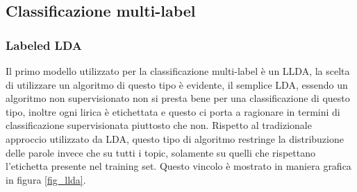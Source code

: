 \documentclass[technote]{IEEEtran}
\begin{document}
\subsection{Classificazione multi-label}
\subsubsection{Labeled LDA}
Il primo modello utilizzato per la classificazione multi-label è un LLDA, la 
scelta di utilizzare un algoritmo di questo tipo è evidente, il semplice LDA, 
essendo un algoritmo non supervisionato non si presta bene per una 
classificazione di questo tipo, inoltre ogni lirica è etichettata e questo ci 
porta a ragionare in termini di classificazione supervisionata piuttosto che 
non. Rispetto al tradizionale approccio utilizzato da LDA, questo tipo di 
algoritmo restringe la distribuzione delle parole invece che su tutti i topic, 
solamente su quelli che rispettano l'etichetta presente nel training set. 
Questo vincolo è mostrato in maniera grafica in figura \ref{fig_llda}.
\end{document}
